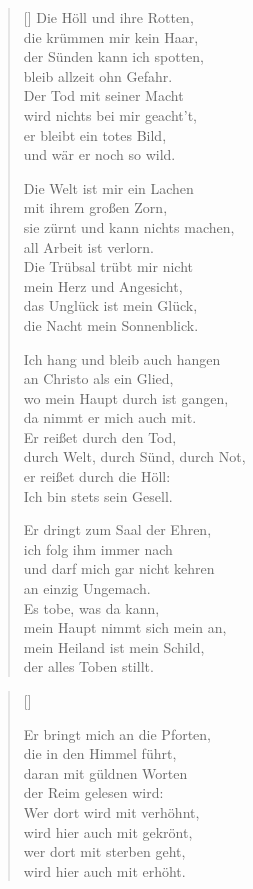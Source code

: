 \begin{multicols}{2}
\begin{verse}[\versewidth]
 Die Höll und ihre Rotten,\\
die krümmen mir kein Haar,\\
der Sünden kann ich spotten,\\
bleib allzeit ohn Gefahr.\\
Der Tod mit seiner Macht\\
wird nichts bei mir geacht't,\\
er bleibt ein totes Bild,\\
und wär er noch so wild.

 Die Welt ist mir ein Lachen\\
mit ihrem großen Zorn,\\
sie zürnt und kann nichts machen,\\
all Arbeit ist verlorn.\\
Die Trübsal trübt mir nicht\\
mein Herz und Angesicht,\\
das Unglück ist mein Glück,\\
die Nacht mein Sonnenblick.

 Ich hang und bleib auch hangen\\
an Christo als ein Glied,\\
wo mein Haupt durch ist gangen,\\
da nimmt er mich auch mit.\\
Er reißet durch den Tod,\\
durch Welt, durch Sünd, durch Not,\\
er reißet durch die Höll:\\
Ich bin stets sein Gesell.

 Er dringt zum Saal der Ehren,\\
ich folg ihm immer nach\\
und darf mich gar nicht kehren\\
an einzig Ungemach.\\
Es tobe, was da kann,\\
mein Haupt nimmt sich mein an,\\
mein Heiland ist mein Schild,\\
der alles Toben stillt.

\end{verse}
\end{multicols}

\begin{center}
\settowidth{\versewidth}{Ich hang und bleib auch hangen}
\begin{verse}[\versewidth]
  
 Er bringt mich an die Pforten,\\
die in den Himmel führt,\\
daran mit güldnen Worten\\
der Reim gelesen wird:\\
Wer dort wird mit verhöhnt,\\
wird hier auch mit gekrönt,\\
wer dort mit sterben geht,\\
wird hier auch mit erhöht.

\end{verse}
\end{center}
